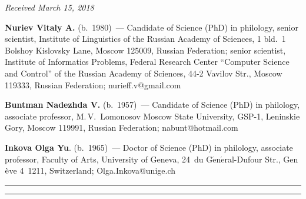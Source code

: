 \vspace*{-6pt}

\hfill{\small\textit{Received March 15, 2018}}

\vspace*{-12pt}
   
  \Contr
  
  \noindent
  \textbf{Nuriev Vitaly A.} (b.\ 1980)~--- Candidate of Science (PhD) in 
philology, senior scientist, Institute of Linguistics of the Russian Academy of 
Sciences, 1 bld.~1 Bolshoy Kislovsky Lane, Moscow 125009, Russian Federation; 
senior scientist, Institute of Informatics Problems, Federal Research Center 
``Computer Science and Control'' of the Russian Academy of Sciences, 44-2 
Vavilov Str., Moscow 119333, Russian Federation; \mbox{nurieff.v@gmail.com}
  
  \vspace*{3pt}
  
  \noindent
  \textbf{Buntman Nadezhda V.} (b.\ 1957)~--- Candidate of Science (PhD) in 
philology, associate professor, M.\,V.~Lomonosov Moscow State University, 
GSP-1, Leninskie Gory, Moscow 119991, Russian Federation; 
\mbox{nabunt@hotmail.com}
  
  \vspace*{3pt}
  
  \noindent
  \textbf{Inkova Olga Yu}. (b.\ 1965)~--- Doctor of Science (PhD) in philology, 
associate professor, Faculty of Arts, University of Geneva, 24~du 
G$\acute{\mbox{e}}$n$\acute{\mbox{e}}$ral-Dufour Str., 
Gen$\Grave{\mbox{e}}$ve  4~1211, Switzerland; 
\mbox{Olga.Inkova@unige.ch}
   
   \vspace*{8pt}

\hrule

\vspace*{2pt}

\hrule





\def\tit{ОШИБКИ И~НЕТОЧНОСТИ МАШИННОГО ПЕРЕВОДА РУССКИХ КОННЕКТОРОВ 
НА~ФРАНЦУЗСКИЙ ЯЗЫК$^*$}




\def\titkol{Ошибки и~неточности машинного перевода русских коннекторов 
на~французский язык}

\def\aut{В.\,А.~Нуриев$^{1,2}$, Н.\,В.~Бунтман$^3$, О.\,Ю.~Инькова$^4$}

\def\autkol{В.\,А.~Нуриев, Н.\,В.~Бунтман, О.\,Ю.~Инькова}

